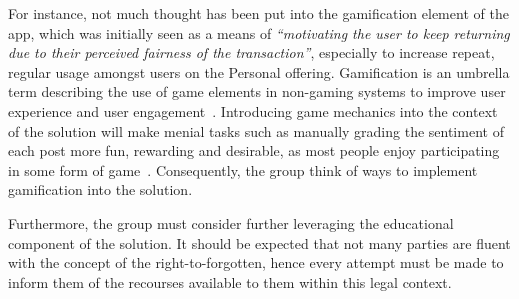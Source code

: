 For instance, not much thought has been put into the gamification element of the app, which was initially seen as a means of \emph{``motivating the user to keep returning due to their perceived fairness of the transaction''}, especially to increase repeat, regular usage amongst users on the Personal offering. Gamification is an umbrella term describing the use of game elements in non-gaming systems to improve user experience and user engagement~\parencite{deterding2011gamification}. Introducing game mechanics into the context of the solution will make menial tasks such as manually grading the sentiment of each post more fun, rewarding and desirable, as most people enjoy participating in some form of game~\parencite{hagglund2012taking}. Consequently, the group think of ways to implement gamification into the solution.

Furthermore, the group must consider further leveraging the educational component of the solution. It should be expected that not many parties are fluent with the concept of the right-to-forgotten, hence every attempt must be made to inform them of the recourses available to them within this legal context.
